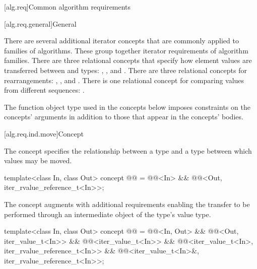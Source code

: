 [alg.req]{Common algorithm requirements}

[alg.req.general]{General}

\pnum
There are several additional iterator concepts that are commonly applied
to families of algorithms. These group together iterator requirements
of algorithm families.
There are three relational concepts that specify
how element values are transferred between
 and  types:
,
, and
.
There are three relational concepts for rearrangements:
,
, and
.
There is one relational concept for comparing values from different sequences:
.

\pnum
\begin{note}
The  function object type
used in the concepts below imposes constraints on the concepts' arguments
in addition to those that appear in the concepts' bodies.
\end{note}

[alg.req.ind.move]{Concept }

\pnum
The  concept specifies the relationship between
a  type and a  type
between which values may be moved.

\begin{codeblock}
template<class In, class Out>
  concept @@ =
    @@<In> &&
    @@<Out, iter_rvalue_reference_t<In>>;
\end{codeblock}

\pnum
The  concept augments
 with additional requirements enabling
the transfer to be performed through an intermediate object of the
 type's value type.

\begin{codeblock}
template<class In, class Out>
  concept @@ =
    @@<In, Out> &&
    @@<Out, iter_value_t<In>> &&
    @@<iter_value_t<In>> &&
    @@<iter_value_t<In>, iter_rvalue_reference_t<In>> &&
    @@<iter_value_t<In>&, iter_rvalue_reference_t<In>>;
\end{codeblock}

